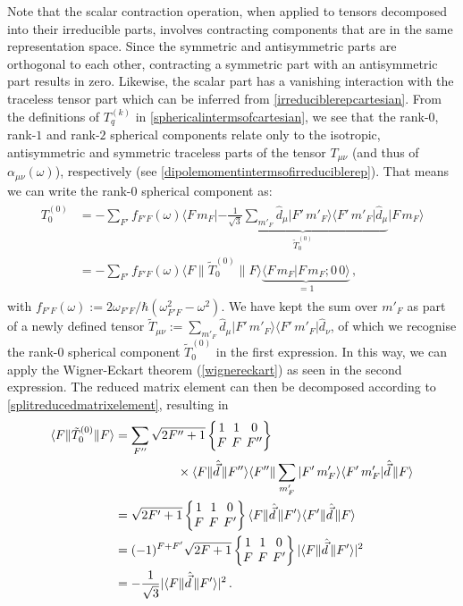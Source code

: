 \documentclass[../Thesis-IJspeert.tex]{subfiles}
\begin{document}
Note that the scalar contraction operation, when applied to tensors decomposed into their irreducible parts, involves contracting components that are in the same representation space. Since the symmetric and antisymmetric parts are orthogonal to each other, contracting a symmetric part with an antisymmetric part results in zero. Likewise, the scalar part has a vanishing interaction with the traceless tensor part which can be inferred from \autoref{irreduciblerepcartesian}. From the definitions of $T_q^{(k)}$ in \autoref{sphericalintermsofcartesian}, we see that the rank-$0$, rank-$1$ and rank-$2$ spherical components relate only to the isotropic, antisymmetric and symmetric traceless parts of the tensor $T_{\mu\nu}$ (and thus of $\alpha_{\mu\nu}(\omega)$), respectively (see \autoref{dipolemomentintermsofirreduciblerep}). That means we can write the rank-$0$ spherical component as:
\begin{align}
\begin{split}
T^{(0)}_0&=-\sum_{F'}f_{F'F}(\omega) \langle F\, m_F \vert \underbrace{-\frac{1}{\sqrt{3}} \sum_{m'_F} \hat{d}_\mu \vert F'\, m'_F \rangle\langle F'\, m'_F \vert \hat{d}_\mu }_{\tilde{T}^{(0)}_0}  \vert F\, m_F \rangle\\&= -\sum_{F'}f_{F'F}(\omega) \langle F\| \tilde{T}^{(0)}_0 \| F \rangle \underbrace{\langle F\, m_F \vert F\, m_F ; 0\,0 \rangle }_{=1} \,,
\end{split}
\end{align}
with $f_{F'F}(\omega):= {2\omega_{F' F} }/{\hbar (\omega_{F' F}^2-\omega^2)}$. We have kept the sum over $m'_F$ as part of a newly defined tensor $\tilde{T}_{\mu\nu}:=\sum_{m'_F} \hat{d}_\mu \vert F'\, m'_F \rangle\langle F'\, m'_F \vert \hat{d}_\nu$, of which we recognise the rank-$0$ spherical component $\tilde{T}^{(0)}_0$ in the first expression. In this way, we can apply the Wigner-Eckart theorem (\autoref{wignereckart}) as seen in the second expression. The reduced matrix element can then be decomposed according to \autoref{splitreducedmatrixelement}, resulting in
\begin{align}
\begin{split}
 \langle F\| \tilde{T}^{(0)}_0 \| F \rangle &= \sum_{F''}\sqrt{2F''+1} \tj{1}{1}{0}{F}{F}{F''}\\ &\hspace{5em}\times \langle F\| \hat{\vec{d}} \, \| F'' \rangle \langle F''\| \sum_{m'_F} \vert F'\, m'_F \rangle\langle F'\, m'_F \vert \hat{\vec{d}} \, \| F \rangle \\ &= \sqrt{2F'+1} \tj{1}{1}{0}{F}{F}{F'} \langle F\| \hat{\vec{d}} \, \| F' \rangle \langle F'\| \hat{\vec{d}} \, \| F \rangle \\ &= (-1)^{F+F'}\sqrt{2F+1} \tj{1}{1}{0}{F}{F}{F'} \lvert \langle{F}\| \hat{\vec{d}} \, \|{F'}\rangle\rvert^2 \\ &=-\frac{1}{\sqrt{3}} \lvert \langle{F}\| \hat{\vec{d}} \, \|{F'}\rangle\rvert^2\,.
 \end{split}
\end{align}
\end{document}
